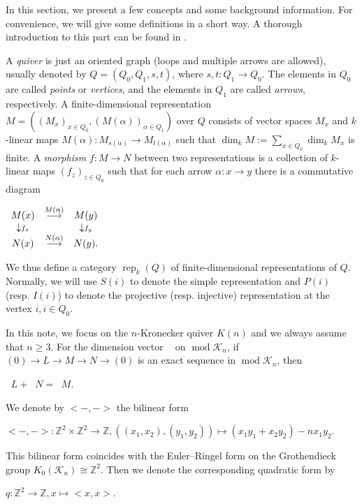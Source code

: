 \documentclass[a4paper,12pt]{amsart}
\newcommand{\cK}{\mathcal{K}}
\DeclareMathOperator{\rep}{rep}
\DeclareMathOperator{\modd}{mod}
\DeclareMathOperator{\dimu}{\underline{dim}}
\begin{document}
 In this section, we present a few concepts and some  background information.  For  convenience, we will give some definitions in a short way. A thorough introduction to this part can be found in  \cite[-]{Assem1}.
 
 A \textit{quiver} is just an oriented graph (loops and multiple arrows are allowed), usually denoted by  $Q=(Q_0, Q_1, s, t)$, where $s,t: Q_1\rightarrow Q_0$. The elements in $Q_0$ are called \textit{points} or \textit{vertices}, and the elements in $Q_1$ are called \textit{arrows}, respectively. A finite-dimensional representation $M=((M_x)_{x\in Q_0}, (M(\alpha))_{\alpha\in Q_1})$ over $Q$ consists of vector spaces $M_{x}$ and $k$-linear maps $M(\alpha): M_{s(\alpha)} \rightarrow M_{t(\alpha)}$ such that $\dim_{k}M:=\sum _{x\in Q_0}\dim_k M_{x}$ is finite. A \textit{morphism} $f: M\rightarrow N$ between two representations is a collection of $k$-linear maps $(f_z)_{z\in Q_0}$ such that for each arrow $\alpha: x\rightarrow y$ there is a commutative diagram

\begin{center}
$\begin{array}[c]{ccc}
M({x})&\stackrel{M(\alpha)}{\longrightarrow}&M(y)\\
\downarrow\scriptstyle{f_x}&&\downarrow\scriptstyle{f_y}\\
N(x)&\stackrel{N(\alpha)}{\longrightarrow}&N(y).
\end{array}$
\end{center}
We thus define a category $\rep_k(Q)$  of  finite-dimensional  representations  of $Q$.  
Normally, we will use  $S(i)$ to denote the simple representation and $P(i)$ (resp. $I(i)$) to denote the projective  (resp. injective) representation at the vertex $i, i\in Q_0.$    
 
In this note, we focus on the  $n$-Kronecker quiver $K(n)$ and we always assume that $n\geq 3$.   For the dimension vector $\dimu$ on $\modd \cK_n$, if  $(0)\rightarrow L \rightarrow M \rightarrow N\rightarrow (0)$ is an exact sequence in $\modd \cK_n$, then
\begin{center}
 $\dimu L+\dimu N= \dimu M$.
\end{center}
We denote by $<-,->$    the  bilinear form
 \begin{center}
$<-,->: \mathbb{Z}^2 \times \mathbb{Z}^2 \rightarrow \mathbb{Z}, ((x_1,x_2),(y_1,y_2))\mapsto (x_1y_1+x_2y_2)-nx_1y_2.$
\end{center}
This bilinear form  coincides with the Euler--Ringel form on the Grothendieck group $K_0(\cK_n)\cong \mathbb{Z}^2$. Then we denote the corresponding quadratic form by
\begin{center}
$q:\mathbb{Z}^2\rightarrow \mathbb{Z},x\mapsto <x,x>$.

\end{center}
\end{document}
